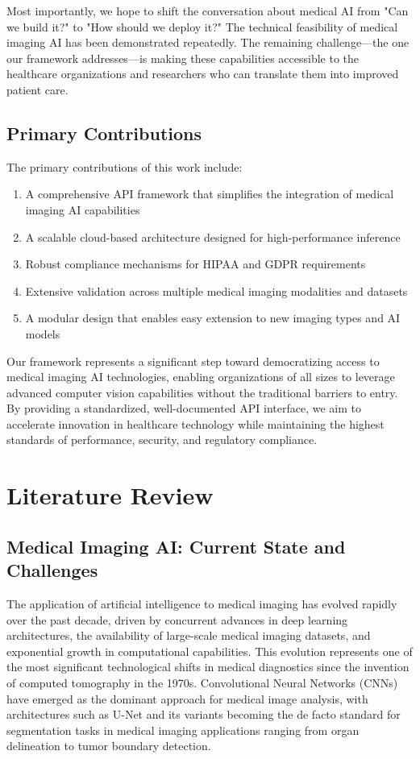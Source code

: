 \documentclass[12pt,a4paper]{article}
\begin{document}
Most importantly, we hope to shift the conversation about medical AI from "Can we build it?" to "How should we deploy it?" The technical feasibility of medical imaging AI has been demonstrated repeatedly. The remaining challenge—the one our framework addresses—is making these capabilities accessible to the healthcare organizations and researchers who can translate them into improved patient care.

\subsection{Primary Contributions}

The primary contributions of this work include:

\begin{enumerate}
    \item A comprehensive API framework that simplifies the integration of medical imaging AI capabilities
    \item A scalable cloud-based architecture designed for high-performance inference
    \item Robust compliance mechanisms for HIPAA and GDPR requirements
    \item Extensive validation across multiple medical imaging modalities and datasets
    \item A modular design that enables easy extension to new imaging types and AI models
\end{enumerate}

Our framework represents a significant step toward democratizing access to medical imaging AI technologies, enabling organizations of all sizes to leverage advanced computer vision capabilities without the traditional barriers to entry. By providing a standardized, well-documented API interface, we aim to accelerate innovation in healthcare technology while maintaining the highest standards of performance, security, and regulatory compliance.

\section{Literature Review}

\subsection{Medical Imaging AI: Current State and Challenges}

The application of artificial intelligence to medical imaging has evolved rapidly over the past decade, driven by concurrent advances in deep learning architectures, the availability of large-scale medical imaging datasets, and exponential growth in computational capabilities. This evolution represents one of the most significant technological shifts in medical diagnostics since the invention of computed tomography in the 1970s. Convolutional Neural Networks (CNNs) have emerged as the dominant approach for medical image analysis, with architectures such as U-Net \cite{ronneberger2015unet} and its variants becoming the de facto standard for segmentation tasks in medical imaging applications ranging from organ delineation to tumor boundary detection.
\end{document}
